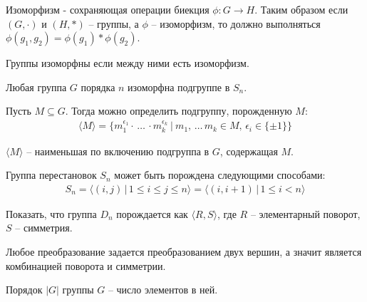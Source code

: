 \begin{definition}
    Изоморфизм - сохраняющая операции биекция $\phi: G \to H$. Таким образом если $\left(G, \cdot\right)$ и 
    $\left(H, *\right)$ -- группы, а $\phi$ -- изоморфизм, то должно выполняться $\phi(g_1, g_2) = \phi(g_1) * \phi(g_2)$.
\end{definition}

\begin{definition}
    Группы изоморфны если между ними есть изоморфизм.
\end{definition}

\begin{theorem}[Кэли]
    Любая группа $G$ порядка $n$ изоморфна подгруппе в $S_n$.
\end{theorem}

\begin{definition}
    Пусть $M \subseteq G$. Тогда можно определить подгруппу, порожденную $M$:
    \begin{gather*}
        \langle M \rangle = \{ m_1^{\epsilon_1} \cdot \, \dots \, \cdot m_k^{\epsilon_k} \: \vert \:
        m_1, \, \dots \, m_k \in M, \, \epsilon_i \in \{\pm 1\}\}
    \end{gather*}
\end{definition}

\begin{note}
    $\langle M \rangle$ -- наименьшая по включению подгруппа в $G$, содержащая $M$.
\end{note}

\begin{example} Группа перестановок $S_n$ может быть порождена следующими способами:
    \begin{gather*}
        S_n = \langle (i, j) \, \vert \, 1 \leq i \leq j \leq n\rangle = 
        \langle (i, i + 1) \, \vert \, 1 \leq i < n \rangle
    \end{gather*}
\end{example}

\begin{exercise}
    Показать, что группа $D_n$ порождается как $\langle R, S\rangle$, где $R$ -- элементарный поворот,
    $S$ -- симметрия.
\end{exercise}

\begin{idea}
    Любое преобразование задается преобразованием двух вершин, а значит является комбинацией поворота и симметрии.
\end{idea}

\begin{definition}
    Порядок $|G|$ группы $G$ -- число элементов в ней.
\end{definition}

